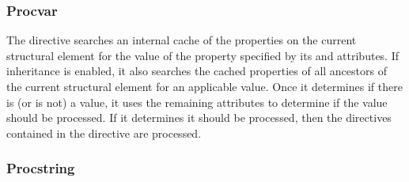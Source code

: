\documentclass[letterpaper,12pt,english,openany,oneside]{sphinxmanual}
\begin{document}
\subsubsection{Proc\sphinxhyphen{}var}
\label{\detokenize{index:proc-var}}
\begin{sphinxVerbatim}[commandchars=\\\{\}]
         
                      
                      
\end{sphinxVerbatim}

The  directive searches an internal cache of the properties on the current structural element for the value of the property specified by its  and  attributes. If inheritance is enabled, it also searches the cached properties of all ancestors of the current structural element for an applicable value. Once it determines if there is (or is not) a value, it uses the remaining attributes to determine if the value should be processed. If it determines it should be processed, then the directives contained in the  directive are processed.


\subsubsection{Proc\sphinxhyphen{}string}
\label{\detokenize{index:proc-string}}
\begin{sphinxVerbatim}[commandchars=\\\{\}]
 
\end{sphinxVerbatim}
\end{document}
